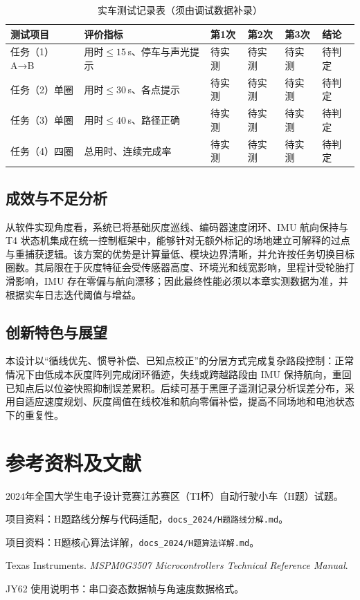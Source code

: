 \documentclass[12pt,a4paper,fontset=fandol]{ctexart}
\newcommand{\code}[1]{\texttt{\small #1}}
\begin{document}
\begin{table}[H]
\centering
\caption{实车测试记录表（须由调试数据补录）}
\small
\begin{tabularx}{\textwidth}{p{2.1cm}Yp{1.25cm}p{1.25cm}p{1.25cm}p{1.35cm}}
\toprule
测试项目 & 评价指标 & 第1次 & 第2次 & 第3次 & 结论\\
\midrule
任务（1）A→B & 用时$\leq15$\,s、停车与声光提示 & 待实测 & 待实测 & 待实测 & 待判定\\
任务（2）单圈 & 用时$\leq30$\,s、各点提示 & 待实测 & 待实测 & 待实测 & 待判定\\
任务（3）单圈 & 用时$\leq40$\,s、路径正确 & 待实测 & 待实测 & 待实测 & 待判定\\
任务（4）四圈 & 总用时、连续完成率 & 待实测 & 待实测 & 待实测 & 待判定\\
\bottomrule
\end{tabularx}
\end{table}

\subsection{成效与不足分析}
从软件实现角度看，系统已将基础灰度巡线、编码器速度闭环、IMU 航向保持与 T4 状态机集成在统一控制框架中，能够针对无额外标记的场地建立可解释的过点与重捕获逻辑。该方案的优势是计算量低、模块边界清晰，并允许按任务切换目标圈数。其局限在于灰度特征会受传感器高度、环境光和线宽影响，里程计受轮胎打滑影响，IMU 存在零偏与航向漂移；因此最终性能必须以本章实测数据为准，并根据实车日志迭代阈值与增益。

\subsection{创新特色与展望}
本设计以“循线优先、惯导补偿、已知点校正”的分层方式完成复杂路段控制：正常情况下由低成本灰度阵列完成闭环循迹，失线或跨越路段由 IMU 保持航向，重回已知点后以位姿快照抑制误差累积。后续可基于黑匣子遥测记录分析误差分布，采用自适应速度规划、灰度阈值在线校准和航向零偏补偿，提高不同场地和电池状态下的重复性。

\section{参考资料及文献}
\begin{enumerate}[label={[\arabic*]}]
  \item 2024年全国大学生电子设计竞赛江苏赛区（TI杯）自动行驶小车（H题）试题。
  \item 项目资料：H题路线分解与代码适配，\code{docs\_2024/H题路线分解.md}。
  \item 项目资料：H题核心算法详解，\code{docs\_2024/H题算法详解.md}。
  \item Texas Instruments. \textit{MSPM0G3507 Microcontrollers Technical Reference Manual}.
  \item JY62 使用说明书：串口姿态数据帧与角速度数据格式。
\end{enumerate}
\end{document}
